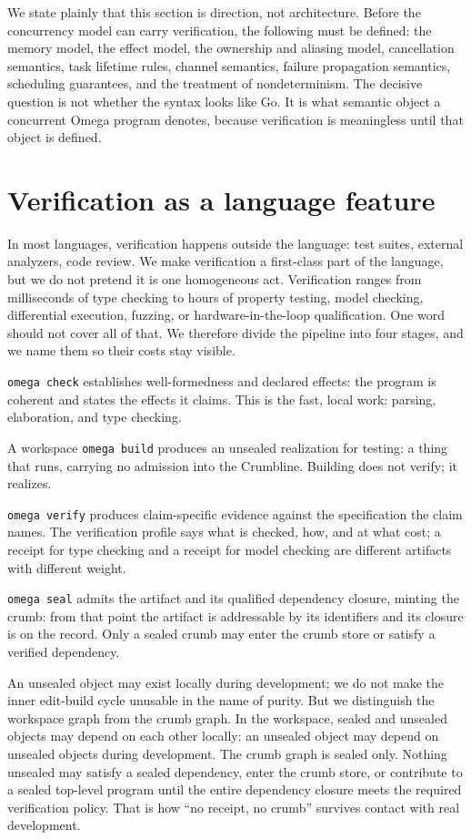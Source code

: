 \documentclass[11pt]{article}
\begin{document}
We state plainly that this section is direction, not architecture. Before
the concurrency model can carry verification, the following must be
defined: the memory model, the effect model, the ownership and aliasing
model, cancellation semantics, task lifetime rules, channel semantics,
failure propagation semantics, scheduling guarantees, and the treatment
of nondeterminism. The decisive question is not whether the syntax looks
like Go. It is what semantic object a concurrent Omega program denotes,
because verification is meaningless until that object is defined.

\section{Verification as a language feature}

In most languages, verification happens outside the language: test suites,
external analyzers, code review. We make verification a first-class part of
the language, but we do not pretend it is one homogeneous act.
Verification ranges from milliseconds of type checking to hours of
property testing, model checking, differential execution, fuzzing, or
hardware-in-the-loop qualification. One word should not cover all of that.
We therefore divide the pipeline into four stages, and we name them so
their costs stay visible.

\texttt{omega check} establishes well-formedness and declared effects:
the program is coherent and states the effects it claims. This is the
fast, local work: parsing, elaboration, and type checking.

A workspace \texttt{omega build} produces an unsealed realization for
testing: a thing that runs, carrying no admission into the Crumbline.
Building does not verify; it realizes.

\texttt{omega verify} produces claim-specific evidence against the
specification the claim names. The verification profile says what is
checked, how, and at what cost; a receipt for type checking and a receipt
for model checking are different artifacts with different weight.

\texttt{omega seal} admits the artifact and its qualified dependency
closure, minting the crumb: from that point the artifact is addressable
by its identifiers and its closure is on the record. Only a sealed crumb
may enter the crumb store or satisfy a verified dependency.

An unsealed object may exist locally during development; we do not make
the inner edit-build cycle unusable in the name of purity. But we
distinguish the workspace graph from the crumb graph. In the workspace,
sealed and unsealed objects may depend on each other locally: an unsealed
object may depend on unsealed objects during development. The crumb graph
is sealed only. Nothing unsealed may satisfy a sealed dependency, enter
the crumb store, or contribute to a sealed top-level program until the
entire dependency closure meets the required verification policy. That is
how ``no receipt, no crumb'' survives contact with real development.
\end{document}
